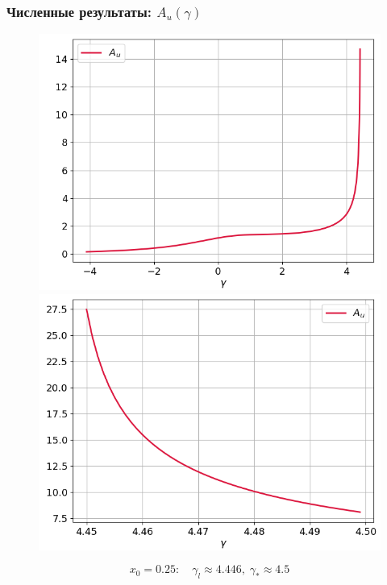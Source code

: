 \documentclass[fullscreen=true, unicode, bookmarks=false]{beamer}
\begin{document}
\begin{frame}
\frametitle{ Численные результаты: $ A_u(\gamma) $ }

\begin{figure} 
\includegraphics[scale=0.37]{divergent_amplitude_14_1.png}  
\hfill
\includegraphics[scale=0.37]{divergent_amplitude_14_2.png}  
\end{figure}

$$ x_0 = 0.25: \quad \gamma_l \approx 4.446, \; \gamma_* \approx 4.5 $$

\end{frame}
\end{document}
